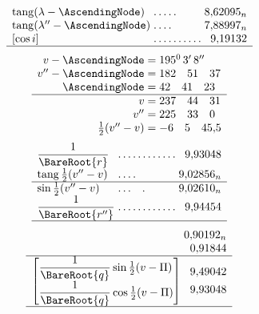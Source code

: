 \[
\begin{array}{l@{\;}l@{\;}r}
\operatorname{tang}(\lambda-\AscendingNode)&\mathord{.}\,\mathord{.}\,\mathord{.}\,\mathord{.}\,\mathord{.}&8{,}62095_n\\
\operatorname{tang}(\lambda''-\AscendingNode)&\mathord{.}\,\mathord{.}\,\mathord{.}\,\mathord{.}&7{,}88997_n\\
{}[\cos i]&\mathord{.}\,\mathord{.}\,\mathord{.}\,\mathord{.}\,\mathord{.}\,\mathord{.}\,\mathord{.}\,\mathord{.}\,\mathord{.}\,\mathord{.}&9{,}19132\\\hline
\end{array}
\]
\[
\begin{array}{r@{\;}l}
v-\AscendingNode=&195^{0}\,3'\,8''\\
v''-\AscendingNode=&182\quad51\quad37\\
\AscendingNode=&42\quad41\quad23\\\hline
v=&237\quad44\quad31\\
v''=&225\quad33\quad0\\
\frac{1}{2}(v''-v)=&-6\quad5\quad45{,}5
\end{array}
\]
\[
\begin{array}{l@{\;}l@{\;}r}
\dfrac{1}{\BareRoot{r}}&\mathord{.}\,\mathord{.}\,\mathord{.}\,\mathord{.}\,\mathord{.}\,\mathord{.}\,\mathord{.}\,\mathord{.}\,\mathord{.}\,\mathord{.}\,\mathord{.}\,\mathord{.}&9{,}93048\\[3pt]
\operatorname{tang}\frac{1}{2}(v''-v)&\mathord{.}\,\mathord{.}\,\mathord{.}\,\mathord{.}&9{,}02856_n\\\hline
\sin\frac{1}{2}(v''-v)&\mathord{.}\,\mathord{.}\,\mathord{.}\quad\mathord{.}&9{,}02610_n\\
\dfrac{1}{\BareRoot{r''}}&\mathord{.}\,\mathord{.}\,\mathord{.}\,\mathord{.}\,\mathord{.}\,\mathord{.}\,\mathord{.}\,\mathord{.}\,\mathord{.}\,\mathord{.}\,\mathord{.}\,\mathord{.}&9{,}94454\\[3pt]\hline
\end{array}
\]
\[
\begin{array}{l@{\;}r}
&0{,}90192_n\\
&0{,}91844\\\hline
\left[\begin{array}{@{}l@{}}\dfrac{1}{\BareRoot{q}}\sin\frac{1}{2}(v-\Pi)\\[4pt]\dfrac{1}{\BareRoot{q}}\cos\frac{1}{2}(v-\Pi)\end{array}\right]&
\begin{array}{@{}r@{}}9{,}49042\\[4pt]9{,}93048\end{array}\\\hline
\end{array}
\]
